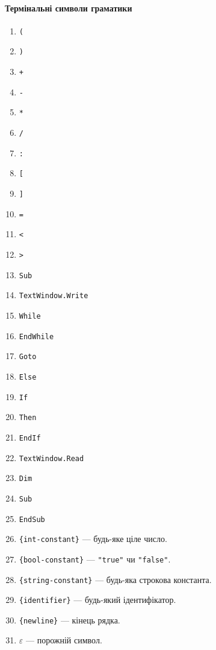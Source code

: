 \documentclass[a4paper,12pt,notitlepage,pdftex]{scrreprt}
\begin{document}
        \paragraph{Термінальні символи граматики}
        \label{para:term}
        \begin{multicols}{3}
            \begin{enumerate}
                \item \verb'('
                \item \verb')'
                \item \verb'+'
                \item \verb'-'
                \item \verb'*'
                \item \verb'/'
                \item \verb':'
                \item \verb'['
                \item \verb']'
                \item \verb'='
                \item \verb'<'
                \item \verb'>'
                \item \verb'Sub'
                \item \verb'TextWindow.Write'
                \item \verb'While'
                \item \verb'EndWhile'
                \item \verb'Goto'
                \item \verb'Else'
                \item \verb'If'
                \item \verb'Then'
                \item \verb'EndIf'
                \item \verb'TextWindow.Read'
                \item \verb'Dim'
                \item \verb'Sub'
                \item \verb'EndSub'
                \item \verb'{int-constant}' --- будь-яке ціле число.
                \item \verb'{bool-constant}' --- \verb'"true"' чи \verb'"false"'.
                \item \verb'{string-constant}' --- будь-яка строкова константа.
                \item \verb'{identifier}' --- будь-який ідентифікатор.
                \item \verb'{newline}' --- кінець рядка.
                \item $\varepsilon$ --- порожній символ.
            \end{enumerate}
        \end{multicols}
\end{document}
